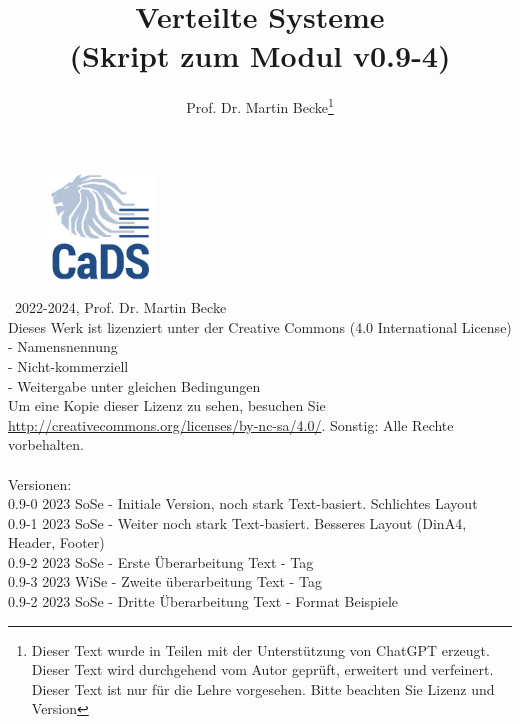\documentclass[a4paper]{article}
\title{Verteilte Systeme\\ (Skript zum Modul v0.9-4)}
\author{Prof. Dr. Martin Becke\footnote{Dieser Text wurde in Teilen mit der Unterstützung von ChatGPT erzeugt. Dieser Text{} wird durchgehend vom Autor geprüft, erweitert und verfeinert. Dieser Text ist nur für die Lehre vorgesehen. Bitte beachten Sie Lizenz und Version}}
\begin{document}
\maketitle
\vspace*{\fill} %
\begin{figure}[h]
  \centering
  \includegraphics[width=0.25\textwidth]{fig/graphics/CADS_Logo_Quadrat_300x300_RGB_72dpi.jpg} %
\end{figure}
\vspace*{\fill}

\newpage

\noindent
\textcopyright\ 2022-2024, Prof. Dr. Martin Becke\\
Dieses Werk ist lizenziert unter der Creative Commons (4.0 International License)\\
- Namensnennung\\ - Nicht-kommerziell\\ - Weitergabe unter gleichen Bedingungen \\Um eine Kopie dieser Lizenz zu sehen, besuchen Sie\\ \url{http://creativecommons.org/licenses/by-nc-sa/4.0/}. 
Sonstig: Alle Rechte vorbehalten.
\noindent
\\\\
Versionen:\\
0.9-0 2023 SoSe - Initiale Version, noch stark Text-basiert. Schlichtes Layout\\
0.9-1 2023 SoSe - Weiter noch stark Text-basiert. Besseres Layout (DinA4, Header, Footer)\\
0.9-2 2023 SoSe - Erste Überarbeitung Text - Tag\\
0.9-3 2023 WiSe - Zweite überarbeitung Text - Tag \\
0.9-2 2023 SoSe - Dritte Überarbeitung Text - Format Beispiele\\
\end{document}
